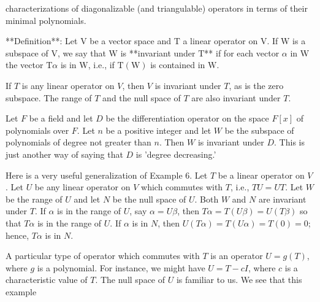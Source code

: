 characterizations of diagonalizable (and triangulable) operators in terms of their minimal polynomials.

**Definition**: Let \(\mathrm{V}\) be a vector space and \(\mathrm{T}\) a linear operator on \(\mathrm{V}\). If \(\mathrm{W}\) is a subspace of \(\mathrm{V}\), we say that \(\mathrm{W}\) is **invariant under \(\mathrm{T}\)** if for each vector \(\alpha\) in \(\mathrm{W}\) the vector \(\mathrm{T}\alpha\) is in \(\mathrm{W}\), i.e., if \(\mathrm{T}(\mathrm{W})\) is contained in \(\mathrm{W}\).

If \(T\) is any linear operator on \(V\), then \(V\) is invariant under \(T\), as is the zero subspace. The range of \(T\) and the null space of \(T\) are also invariant under \(T\).

Let \(F\) be a field and let \(D\) be the differentiation operator on the space \(F[x]\) of polynomials over \(F\). Let \(n\) be a positive integer and let \(W\) be the subspace of polynomials of degree not greater than \(n\). Then \(W\) is invariant under \(D\). This is just another way of saying that \(D\) is 'degree decreasing.'

Here is a very useful generalization of Example 6. Let \(T\) be a linear operator on \(V\). Let \(U\) be any linear operator on \(V\) which commutes with \(T\), i.e., \(TU=UT\). Let \(W\) be the range of \(U\) and let \(N\) be the null space of \(U\). Both \(W\) and \(N\) are invariant under \(T\). If \(\alpha\) is in the range of \(U\), say \(\alpha=U\beta\), then \(T\alpha=T(U\beta)=U(T\beta)\) so that \(T\alpha\) is in the range of \(U\). If \(\alpha\) is in \(N\), then \(U(T\alpha)=T(U\alpha)=T(0)=0\); hence, \(T\alpha\) is in \(N\).

A particular type of operator which commutes with \(T\) is an operator \(U=g(T)\), where \(g\) is a polynomial. For instance, we might have \(U=T-cI\), where \(c\) is a characteristic value of \(T\). The null space of \(U\) is familiar to us. We see that this example 